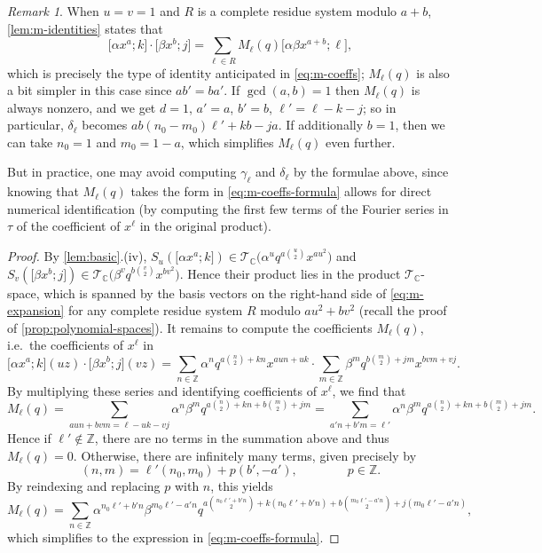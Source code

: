 \documentclass[reqno,11pt]{amsart}
\theoremstyle{definition}
\theoremstyle{remark}
\newtheorem*{remark}{Remark}
\numberwithin{equation}{section}
\newcommand{\Z}{\mathbb{Z}}
\newcommand{\C}{\mathbb{C}}
\newcommand{\mT}{\mathcal{T}}
\newcommand{\vect}[2]{\big[{#1};{#2}\big]}
\begin{document}
\begin{remark}
When $u = v = 1$ and $R$ is a complete residue system modulo $a+b$, \cref{lem:m-identities} states that
\[
    \vect{\alpha x^a}{k} \cdot \vect{\beta x^b}{j}
    =
    \sum_{\ell \in R} M_\ell(q) \vect{\alpha \beta x^{a+b}}{\ell},
\]
which is precisely the type of identity anticipated in \cref{eq:m-coeffs}; $M_\ell(q)$ is also a bit simpler in this case since $ab' = ba'$. If $\gcd(a, b) = 1$ then $M_\ell(q)$ is always nonzero, and we get $d = 1$, $a' = a$, $b' = b$, $\ell' = \ell - k - j$; so in particular, $\delta_\ell$ becomes $ab(n_0 - m_0)\ell' + kb - ja$. If additionally $b = 1$, then we can take $n_0 = 1$ and $m_0 = 1-a$, which simplifies $M_\ell(q)$ even further.

But in practice, one may avoid computing $\gamma_\ell$ and $\delta_\ell$ by the formulae above, since knowing that $M_\ell(q)$ takes the form in \cref{eq:m-coeffs-formula} allows for direct numerical identification (by computing the first few terms of the Fourier series in $\tau$ of the coefficient of $x^\ell$ in the original product).
\end{remark}


\begin{proof}
By \cref{lem:basic}.(iv), $S_u\left(\vect{\alpha x^a}{k}\right) \in \mT_\C\big(\alpha^u q^{a\binom{u}{2}} x^{au^2} \big)$ and $S_v\left(\vect{\beta x^b}{j}\right) \in \mT_\C\big(\beta^v q^{b\binom{v}{2}} x^{bv^2} \big)$. Hence their product lies in the product $\mT_\C$-space, which is spanned by the basis vectors on the right-hand side of \cref{eq:m-expansion} for any complete residue system $R$ modulo $au^2+bv^2$ (recall the proof of \cref{prop:polynomial-spaces}). It remains to compute the coefficients $M_\ell(q)$, i.e.\ the coefficients of $x^\ell$ in
\[
   \vect{\alpha x^a}{k}(u z) \cdot \vect{\beta x^b}{j}(v z)
   =
   \sum_{n \in \Z} \alpha^n q^{a\binom{n}{2} + kn} x^{aun + uk} 
    \cdot 
    \sum_{m \in \Z} \beta^m q^{b\binom{m}{2}+jm} x^{bvm+vj}.
\]
By multiplying these series and identifying coefficients of $x^\ell$, we find that
\[
    M_\ell(q)
    =
    \sum_{aun+bvm=\ell-uk-vj} 
    \alpha^n \beta^m q^{a\binom{n}{2} + kn + b\binom{m}{2} + jm}
    =
    \sum_{a'n + b'm = \ell'} 
    \alpha^n \beta^m q^{a\binom{n}{2} + kn + b\binom{m}{2} + jm}.
\]
Hence if $\ell' \not\in \Z$, there are no terms in the summation above and thus $M_\ell(q) = 0$. Otherwise, there are infinitely many terms, given precisely by
\[
    (n, m) = \ell'(n_0, m_0) + p(b', -a'), 
    \qquad\qquad p \in \Z.
\]
By reindexing and replacing $p$ with $n$, this yields
\[
    M_\ell(q) 
    =
    \sum_{n \in \Z} \alpha^{n_0\ell'  + b'n} \beta^{m_0\ell'  - a'n} 
    q^{a\binom{n_0\ell' + b'n}{2} + k(n_0\ell'  + b'n) + b \binom{m_0\ell' - a'n}{2} + j(m_0\ell' - a'n)},
\]
which simplifies to the expression in \cref{eq:m-coeffs-formula}.
\end{proof}
\end{document}
